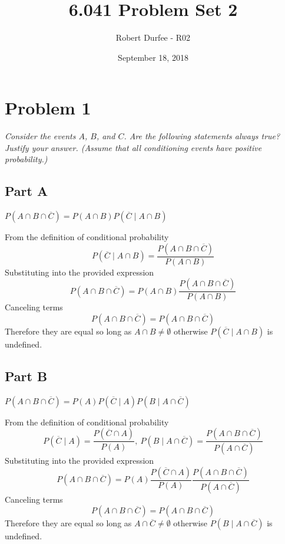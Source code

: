 \documentclass{article}
\title{6.041 Problem Set 2}
\author{Robert Durfee - R02}
\date{September 18, 2018}
\begin{document}
\maketitle

\section*{Problem 1}

\textit{Consider the events $ A $, $ B $, and $ C $. Are the following
statements always true? Justify your answer. (Assume that all conditioning
events have positive probability.)}

\subsection*{Part A}

\textit{$ P \left( A \cap B \cap \overline{C} \right) = P \left( A \cap B
\right) P \left( \overline{C} \mid A \cap B \right) $}

\bigbreak

From the definition of conditional probability
$$ P ( \overline{C} \mid A \cap B ) = \frac{ P ( A \cap B \cap \overline{C} ) }{
    P ( A \cap B ) } $$
Substituting into the provided expression
$$ P ( A \cap B \cap \overline{C} ) = P ( A \cap B ) \frac{ P ( A \cap B \cap
\overline{C} ) }{ P ( A \cap B ) } $$
Canceling terms
$$ P ( A \cap B \cap \overline{C} ) =  P ( A \cap B \cap \overline{C} ) $$
Therefore they are equal so long as $ A \cap B \neq \emptyset $ otherwise $
P(\overline{C} \mid A \cap B) $ is undefined.

\subsection*{Part B}

\textit{$ P \left( A \cap B \cap \overline{C} \right) = P \left( A \right) P
\left( \overline{C} \mid A \right) P \left( B \mid A \cap \overline{C} \right)
$}

\bigbreak

From the definition of conditional probability
$$ P ( \overline{C} \mid A ) = \frac{ P ( \overline{C} \cap A ) }{ P ( A ) },\ P
( B \mid A \cap \overline{C} ) = \frac{ P ( A \cap B \cap \overline{C} ) }{ P (
A \cap \overline{C} ) } $$
Substituting into the provided expression
$$ P ( A \cap B \cap \overline{C} ) = P ( A ) \frac{ P ( \overline{C} \cap A )
}{ P ( A ) } \frac{ P ( A \cap B \cap \overline{C} ) }{ P ( A \cap \overline{C}
) } $$
Canceling terms
$$ P ( A \cap B \cap \overline{C} ) =  P ( A \cap B \cap \overline{C} ) $$
Therefore they are equal so long as $ A \cap \overline{C} \neq \emptyset $
otherwise $ P(B \mid A \cap \overline{C} ) $ is undefined.
\end{document}

